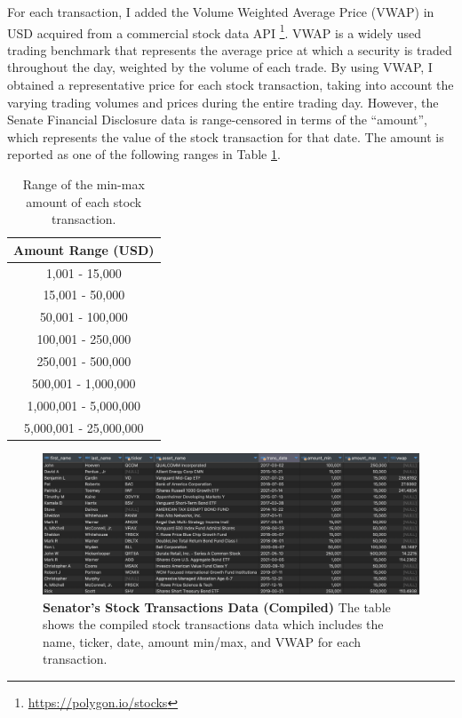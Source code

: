 \documentclass[15pt,letterpaper]{article}
\begin{document}
For each transaction, I added the Volume Weighted Average Price (VWAP) in USD acquired from a commercial stock data API \footnote{\url{https://polygon.io/stocks}}. VWAP is a widely used trading benchmark \citep{vwap1, vwap2, vwap3} that represents the average price at which a security is traded throughout the day, weighted by the volume of each trade. By using VWAP, I obtained a representative price for each stock transaction, taking into account the varying trading volumes and prices during the entire trading day.
However, the Senate Financial Disclosure data is range-censored in terms of the ``amount'', which represents the value of the stock transaction for that date. The amount is reported as one of the following ranges in Table \ref{tb:rg}.

\begin{table}[h]
  \centering
  \begin{tabular}{c}
  \hline
  Amount Range (USD) \\
  \hline
  1,001 - 15,000 \\
  15,001 - 50,000 \\
  50,001 - 100,000 \\
  100,001 - 250,000 \\
  250,001 - 500,000 \\
  500,001 - 1,000,000 \\
  1,000,001 - 5,000,000 \\
  5,000,001 - 25,000,000 \\
  \hline
  \end{tabular}
  \caption{Range of the min-max amount of each stock transaction.}
  \label{tb:rg}
\end{table}



\begin{figure}[h]
  \centering
  \includegraphics[width=1\textwidth]{imgs/tb-trans.png}
  \caption{\textbf{Senator's Stock Transactions Data (Compiled)} The table shows the compiled stock transactions data which includes the name, ticker, date, amount min/max, and VWAP for each transaction.}
  \label{fig:trans-example}
\end{figure}
\end{document}

